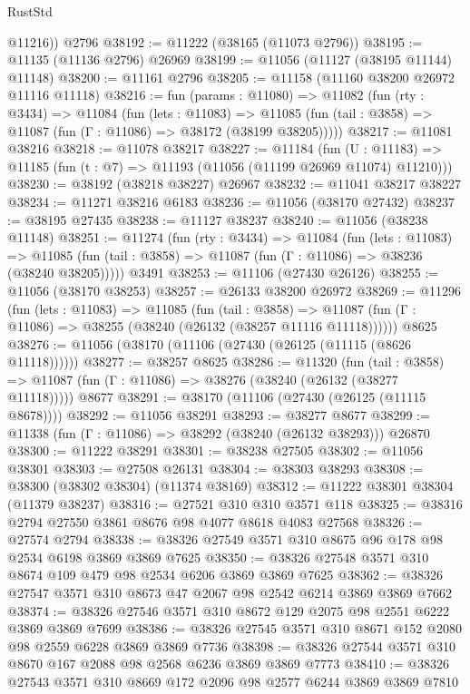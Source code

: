 \begin{lexlean}{RustStd}
\begin{coremodule}
        @11216))
    @2796
@38192 := @11222 (@38165 (@11073 @2796))
@38195 := @11135 (@11136 @2796) @26969
@38199 := @11056 (@11127 (@38195 @11144) @11148)
@38200 := @11161 @2796
@38205 := @11158 (@11160 @38200 @26972 @11116 @11118)
@38216 := fun (params : @11080) =>
  @11082
    (fun (rty : @3434) =>
    @11084
      (fun (lets : @11083) =>
      @11085 (fun (tail : @3858) => @11087 (fun (Γ : @11086) => @38172 (@38199 @38205)))))
@38217 := @11081 @38216
@38218 := @11078 @38217
@38227 := @11184
    (fun (U : @11183) => @11185 (fun (t : @7) => @11193 (@11056 (@11199 @26969 @11074) @11210)))
@38230 := @38192 (@38218 @38227) @26967
@38232 := @11041 @38217 @38227
@38234 := @11271 @38216 @6183
@38236 := @11056 (@38170 @27432)
@38237 := @38195 @27435
@38238 := @11127 @38237
@38240 := @11056 (@38238 @11148)
@38251 := @11274
    (fun (rty : @3434) =>
    @11084
      (fun (lets : @11083) =>
      @11085 (fun (tail : @3858) => @11087 (fun (Γ : @11086) => @38236 (@38240 @38205)))))
    @3491
@38253 := @11106 (@27430 @26126)
@38255 := @11056 (@38170 @38253)
@38257 := @26133 @38200 @26972
@38269 := @11296
    (fun (lets : @11083) =>
    @11085
      (fun (tail : @3858) =>
      @11087 (fun (Γ : @11086) => @38255 (@38240 (@26132 (@38257 @11116 @11118))))))
    @8625
@38276 := @11056 (@38170 (@11106 (@27430 (@26125 (@11115 (@8626 @11118))))))
@38277 := @38257 @8625
@38286 := @11320
    (fun (tail : @3858) => @11087 (fun (Γ : @11086) => @38276 (@38240 (@26132 (@38277 @11118)))))
    @8677
@38291 := @38170 (@11106 (@27430 (@26125 (@11115 @8678))))
@38292 := @11056 @38291
@38293 := @38277 @8677
@38299 := @11338 (fun (Γ : @11086) => @38292 (@38240 (@26132 @38293))) @26870
@38300 := @11222 @38291
@38301 := @38238 @27505
@38302 := @11056 @38301
@38303 := @27508 @26131
@38304 := @38303 @38293
@38308 := @38300 (@38302 @38304) (@11374 @38169)
@38312 := @11222 @38301 @38304 (@11379 @38237)
@38316 := @27521 @310 @310 @3571 @118
@38325 := @38316 @2794 @27550 @3861 @8676 @98 @4077 @8618 @4083 @27568
@38326 := @27574 @2794
@38338 := @38326 @27549 @3571 @310 @8675 @96 @178 @98 @2534 @6198 @3869 @3869 @7625
@38350 := @38326 @27548 @3571 @310 @8674 @109 @479 @98 @2534 @6206 @3869 @3869 @7625
@38362 := @38326 @27547 @3571 @310 @8673 @47 @2067 @98 @2542 @6214 @3869 @3869 @7662
@38374 := @38326 @27546 @3571 @310 @8672 @129 @2075 @98 @2551 @6222 @3869 @3869 @7699
@38386 := @38326 @27545 @3571 @310 @8671 @152 @2080 @98 @2559 @6228 @3869 @3869 @7736
@38398 := @38326 @27544 @3571 @310 @8670 @167 @2088 @98 @2568 @6236 @3869 @3869 @7773
@38410 := @38326 @27543 @3571 @310 @8669 @172 @2096 @98 @2577 @6244 @3869 @3869 @7810

\end{coremodule}
\end{lexlean}
